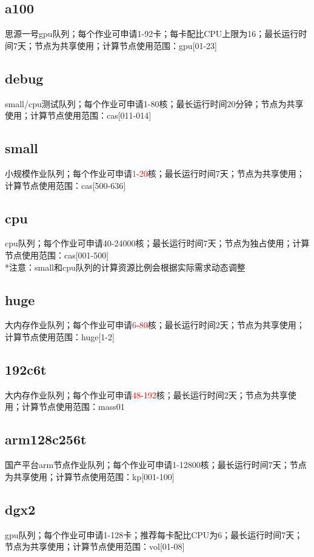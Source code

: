 \documentclass[cn, 12pt, hang, black, chinese]{elegantbook}
\begin{document}
\subsection*{a100}
思源一号gpu队列；每个作业可申请1-92卡；每卡配比CPU上限为16；最长运行时间7天；节点为共享使用；计算节点使用范围：gpu[01-23]

\subsection*{debug}
small/cpu测试队列；每个作业可申请1-80核；最长运行时间20分钟；节点为共享使用；计算节点使用范围：cas[011-014]

\subsection*{small}
小规模作业队列；每个作业可申请\textcolor{red}{1-20}核；最长运行时间7天；节点为共享使用；计算节点使用范围：cas[500-636]

\subsection*{cpu}
cpu队列；每个作业可申请40-24000核；最长运行时间7天；节点为独占使用；计算节点使用范围：cas[001-500]\\*注意：small和cpu队列的计算资源比例会根据实际需求动态调整

\subsection*{huge}
大内存作业队列；每个作业可申请\textcolor{red}{6-80}核；最长运行时间2天；节点为共享使用；计算节点使用范围：huge[1-2]

\subsection*{192c6t}
大内存作业队列；每个作业可申请\textcolor{red}{48-192}核；最长运行时间2天；节点为共享使用；计算节点使用范围：mass01

\subsection*{arm128c256t}
国产平台arm节点作业队列；每个作业可申请1-12800核；最长运行时间7天；节点为共享使用；计算节点使用范围：kp[001-100]

\subsection*{dgx2}
gpu队列；每个作业可申请1-128卡；推荐每卡配比CPU为6；最长运行时间7天；节点为共享使用；计算节点使用范围：vol[01-08]
\end{document}
